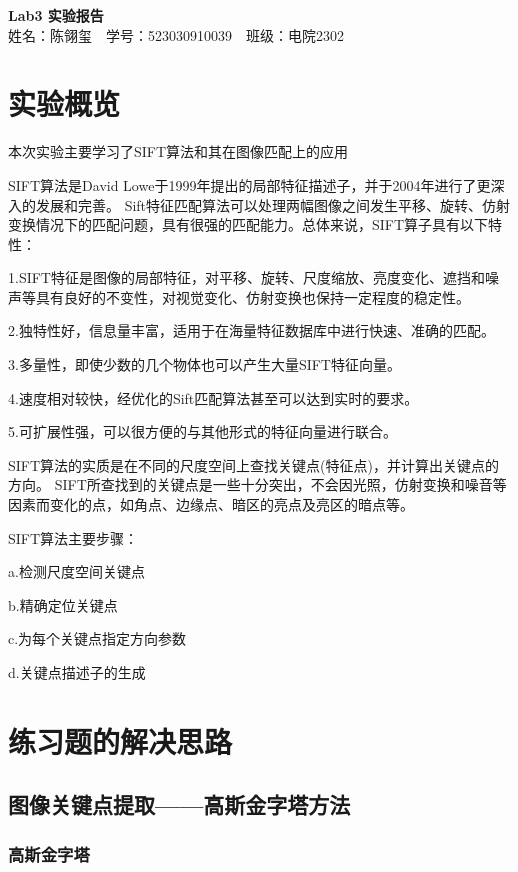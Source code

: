 \documentclass{article}
\begin{document}
\begin{center}
    \Large \textbf{Lab3 实验报告}\\
    \vspace{1em}
    姓名：陈翎玺~~学号：523030910039~~班级：电院2302
\end{center}

\section{实验概览}

    本次实验主要学习了SIFT算法和其在图像匹配上的应用

    SIFT算法是David Lowe于1999年提出的局部特征描述子，并于2004年进行了更深入的发展和完善。
    Sift特征匹配算法可以处理两幅图像之间发生平移、旋转、仿射变换情况下的匹配问题，具有很强的匹配能力。总体来说，SIFT算子具有以下特性：

    1.SIFT特征是图像的局部特征，对平移、旋转、尺度缩放、亮度变化、遮挡和噪声等具有良好的不变性，对视觉变化、仿射变换也保持一定程度的稳定性。

    2.独特性好，信息量丰富，适用于在海量特征数据库中进行快速、准确的匹配。

    3.多量性，即使少数的几个物体也可以产生大量SIFT特征向量。

    4.速度相对较快，经优化的Sift匹配算法甚至可以达到实时的要求。

    5.可扩展性强，可以很方便的与其他形式的特征向量进行联合。

    SIFT算法的实质是在不同的尺度空间上查找关键点(特征点)，并计算出关键点的方向。
    SIFT所查找到的关键点是一些十分突出，不会因光照，仿射变换和噪音等因素而变化的点，如角点、边缘点、暗区的亮点及亮区的暗点等。

    SIFT算法主要步骤：

a.检测尺度空间关键点

b.精确定位关键点

c.为每个关键点指定方向参数

d.关键点描述子的生成

\section{练习题的解决思路}

\subsection{图像关键点提取——高斯金字塔方法}

\subsubsection{高斯金字塔}
\end{document}
